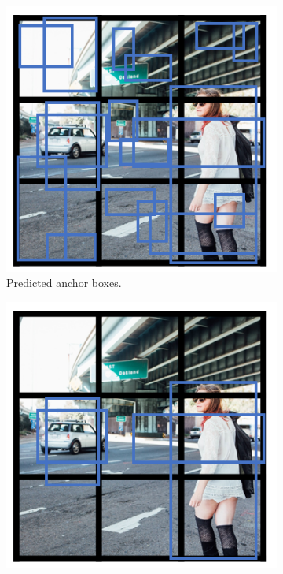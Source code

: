 \begin{figure}[!htbp]
\begin{subfigure}{.33\textwidth}
  \centering
  \includegraphics[width=1.0\linewidth]{img/c4/yolo4.png}  
  \caption{Predicted anchor boxes.}
  \label{yolo4}
\end{subfigure}
\begin{subfigure}{.33\textwidth}
  \centering
  \includegraphics[width=1.0\linewidth]{img/c4/yolo5.png}  

\end{subfigure}
\end{figure}
